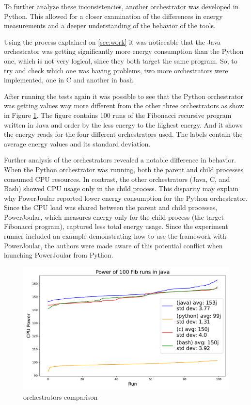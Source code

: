 \documentclass[sigplan]{acmart}
\begin{document}
To further analyze these inconsistencies, another orchestrator was developed in Python. This allowed for a closer examination of the differences in energy measurements and a deeper understanding of the behavior of the tools.

Using the process explained on \ref{sec:work} it was noticeable that the Java orchestrator was getting significantly more energy consumption than the Python one, which is not very logical, since they both target the same program. So, to try and check which one was having problems, two more orchestrators were implemented, one in C and another in bash.

After running the tests again it was possible to see that the Python orchestrator was getting values way more different from the other three orchestrators as show in Figure \ref{fig:4_orchs_comparison}.
The figure contains 100 runs of the Fibonacci recursive program written in Java and order by the less energy to the highest energy. And it shows the energy reads for the four different orchestrators used. The labels contain the average energy values and its standard deviation.

Further analysis of the orchestrators revealed a notable difference in behavior. When the Python orchestrator was running, both the parent and child processes consumed CPU resources. In contrast, the other orchestrators (Java, C, and Bash) showed CPU usage only in the child process. This disparity may explain why PowerJoular reported lower energy consumption for the Python orchestrator. Since the CPU load was shared between the parent and child processes, PowerJoular, which measures energy only for the child process (the target Fibonacci program), captured less total energy usage.
Since the experiment runner included an example demonstrating how to use the framework with PowerJoular, the authors were made aware of this potential conflict when launching PowerJoular from Python.

\begin{figure}%
  \centering
  \includegraphics[width = 0.5 \textwidth]{figures/4_orchestrators_comparison.pdf}
  \caption{orchestrators comparison}
  \label{fig:4_orchs_comparison}
\end{figure}
\end{document}
